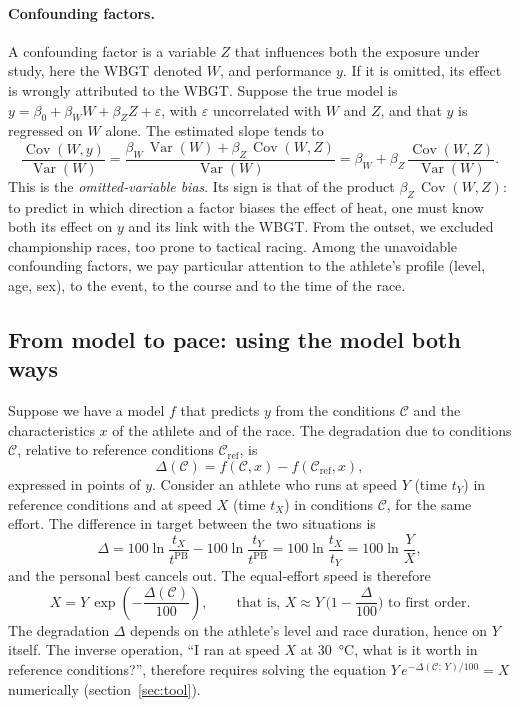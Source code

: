 \documentclass[11pt,a4paper]{article}
\DeclareMathOperator{\Var}{Var}
\DeclareMathOperator{\Cov}{Cov}
\newcommand{\PB}{\mathrm{PB}}
\begin{document}
\paragraph{Confounding factors.} A confounding factor is a variable $Z$ that influences both the exposure under study,
here the WBGT denoted $W$, and performance $y$. If it is omitted, its effect is wrongly attributed to the WBGT. Suppose
the true model is $y = \beta_0 + \beta_W W + \beta_Z Z + \varepsilon$, with $\varepsilon$ uncorrelated with $W$ and
$Z$, and that $y$ is regressed on $W$ alone. The estimated slope tends to
\begin{equation}\label{eq:omitted_bias}
\frac{\Cov(W, y)}{\Var(W)} = \frac{\beta_W\,\Var(W) + \beta_Z\,\Cov(W, Z)}{\Var(W)}
= \beta_W + \beta_Z\,\frac{\Cov(W, Z)}{\Var(W)} .
\end{equation}
This is the \emph{omitted-variable bias}. Its sign is that of the product $\beta_Z\,\Cov(W, Z)$: to predict in which
direction a factor biases the effect of heat, one must know both its effect on $y$ and its link with the WBGT. From the
outset, we excluded championship races, too prone to tactical racing. Among the unavoidable confounding factors, we pay
particular attention to the athlete's profile (level, age, sex), to the event, to the course and to the time of the
race.

\subsection{From model to pace: using the model both ways}\label{sec:both_ways}

Suppose we have a model $f$ that predicts $y$ from the conditions $\mathcal{C}$ and the characteristics $x$ of the
athlete and of the race. The degradation due to conditions $\mathcal{C}$, relative to reference conditions
$\mathcal{C}_{\text{ref}}$, is
\begin{equation}\label{eq:degradation}
\Delta(\mathcal{C}) = f(\mathcal{C}, x) - f(\mathcal{C}_{\text{ref}}, x),
\end{equation}
expressed in points of $y$. Consider an athlete who runs at speed $Y$ (time $t_Y$) in reference conditions and at
speed $X$ (time $t_X$) in conditions $\mathcal{C}$, for the same effort. The difference in target between the two
situations is
\[
\Delta = 100\ln\frac{t_X}{t^{\PB}} - 100\ln\frac{t_Y}{t^{\PB}} = 100\ln\frac{t_X}{t_Y} = 100\ln\frac{Y}{X},
\]
and the personal best cancels out. The equal-effort speed is therefore
\begin{equation}\label{eq:conversion}
X = Y\,\exp\!\left(-\frac{\Delta(\mathcal{C})}{100}\right),
\qquad\text{that is, } X \approx Y\,\Big(1 - \frac{\Delta}{100}\Big) \text{ to first order.}
\end{equation}
The degradation $\Delta$ depends on the athlete's level and race duration, hence on $Y$ itself. The inverse operation,
``I ran at speed $X$ at 30~°C, what is it worth in reference conditions?'', therefore requires solving the equation
$Y\,e^{-\Delta(\mathcal{C};\,Y)/100} = X$ numerically (section~\ref{sec:tool}).
\end{document}
